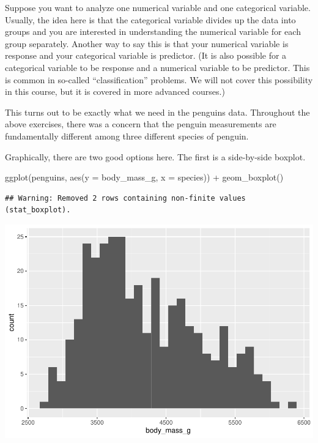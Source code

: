\documentclass[
]{book}
\newenvironment{Shaded}{\begin{snugshade}}{\end{snugshade}}
\newcommand{\AttributeTok}[1]{\textcolor[rgb]{0.77,0.63,0.00}{#1}}
\newcommand{\FunctionTok}[1]{\textcolor[rgb]{0.00,0.00,0.00}{#1}}
\newcommand{\NormalTok}[1]{#1}
\newcommand{\SpecialCharTok}[1]{\textcolor[rgb]{0.00,0.00,0.00}{#1}}
\begin{document}
Suppose you want to analyze one numerical variable and one categorical variable. Usually, the idea here is that the categorical variable divides up the data into groups and you are interested in understanding the numerical variable for each group separately. Another way to say this is that your numerical variable is response and your categorical variable is predictor. (It is also possible for a categorical variable to be response and a numerical variable to be predictor. This is common in so-called ``classification'' problems. We will not cover this possibility in this course, but it is covered in more advanced courses.)

This turns out to be exactly what we need in the penguins data. Throughout the above exercises, there was a concern that the penguin measurements are fundamentally different among three different species of penguin.

Graphically, there are two good options here. The first is a side-by-side boxplot.

\begin{Shaded}
\begin{Highlighting}[]
\FunctionTok{ggplot}\NormalTok{(penguins, }\FunctionTok{aes}\NormalTok{(}\AttributeTok{y =}\NormalTok{ body\_mass\_g, }\AttributeTok{x =}\NormalTok{ species)) }\SpecialCharTok{+}
    \FunctionTok{geom\_boxplot}\NormalTok{()}
\end{Highlighting}
\end{Shaded}

\begin{verbatim}
## Warning: Removed 2 rows containing non-finite values (stat_boxplot).
\end{verbatim}

\includegraphics{intro_stats_files/figure-latex/unnamed-chunk-107-1.pdf}
\end{document}
